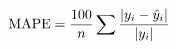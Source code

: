 \documentclass[preview]{standalone}
\begin{document}
\begin{align*}
\special{dvisvgm:raw <g id='unique000'>}\text{MAPE} = \frac{100}{n} \sum \frac{|y_i - \hat{y}_i|}{|y_i|}\special{dvisvgm:raw </g>}
\end{align*}
\end{document}
